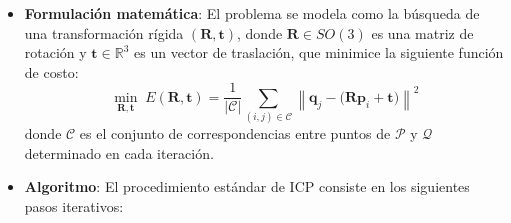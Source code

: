 \documentclass[12pt, a4paper, twoside]{article}
\begin{document}
\begin{itemize}
      \begin{itemize}
        \item \textbf{Formulación matemática}: El problema se modela como la búsqueda de una transformación rígida $(\mathbf{R}, \mathbf{t})$, donde $\mathbf{R} \in SO(3)$ es 
        una matriz de rotación y $\mathbf{t} \in \mathbb{R}^3$ es un vector de traslación, que minimice la siguiente función de costo:
    \[
    \min_{\mathbf{R}, \mathbf{t}} \; 
    E(\mathbf{R}, \mathbf{t}) =
    \frac{1}{|\mathcal{C}|} \sum_{(i,j) \in \mathcal{C}}
    \left\| \mathbf{q}_j - \big(\mathbf{R}\mathbf{p}_i + \mathbf{t}\big) \right\|^2
    \]
    donde $\mathcal{C}$ es el conjunto de correspondencias entre puntos de $\mathcal{P}$ y $\mathcal{Q}$ determinado en cada iteración.  
    
    \item \textbf{Algoritmo}: El procedimiento estándar de ICP consiste en los siguientes pasos iterativos:
    

\end{itemize}
\end{itemize}
\end{document}
